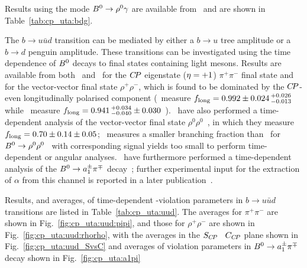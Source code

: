 Results using the mode $B^0 \to \rho^0\gamma$ are available from 
\belle\ and are shown in Table~\ref{tab:cp_uta:bdg}.



\clearpage
{}
\label{sec:cp_uta:uud}

The $b \to u \bar u d$ transition can be mediated by either 
a $b \to u$ tree amplitude or a $b \to d$ penguin amplitude.
These transitions can be investigated using 
the time dependence of $B^0$ decays to final states containing light mesons.
Results are available from both \babar\ and \belle\ for the 
$C\!P$ eigenstate (${\eta} = +1$) $\pi^+\pi^-$ final state
and for the vector-vector final state $\rho^+\rho^-$,
which is found to be dominated by the $C\!P$-even
longitudinally polarised component
(\babar\ measure $f_{\rm long} = 
0.992 \pm 0.024 \, ^{+0.026}_{-0.013}$~\cite{Aubert:2007nua}
while \belle\ measure $f_{\rm long} = 
0.941 \, ^{+0.034}_{-0.040} \pm 0.030$~\cite{Somov:2006sg}).
\babar\ have also performed a time-dependent analysis of the 
vector-vector final state $\rho^0\rho^0$~\cite{:2008iha},
in which they measure  $f_{\rm long} = 0.70 \pm 0.14 \pm 0.05$;
\belle\ measures a smaller branching fraction than \babar\ for
$B^0\to\rho^0\rho^0$~\cite{:2008et} with corresponding signal yields too small
to perform time-dependent or angular analyses.
\babar\ have furthermore performed a time-dependent analysis of the 
$B^0 \to a_1^\pm \pi^\mp$ decay~\cite{Aubert:2006gb}; further experimental
input for the extraction of $\alpha$ from this channel is reported in a later
publication~\cite{:2009ii}.

Results, and averages, of time-dependent \CP-violation parameters in 
$b \to u \bar u d$ transitions are listed in Table~\ref{tab:cp_uta:uud}.
The averages for $\pi^+\pi^-$ are shown in Fig.~\ref{fig:cp_uta:uud:pipi},
and those for $\rho^+\rho^-$ are shown in Fig.~\ref{fig:cp_uta:uud:rhorho},
with the averages in the $S_{C\!P}$ \vs\ $C_{C\!P}$ plane 
shown in Fig.~\ref{fig:cp_uta:uud_SvsC} and
averages of \CP violation parameters in $B^0 \to a_1^\pm \pi^\mp$ decay shown in Fig.~\ref{fig:cp_uta:a1pi}



